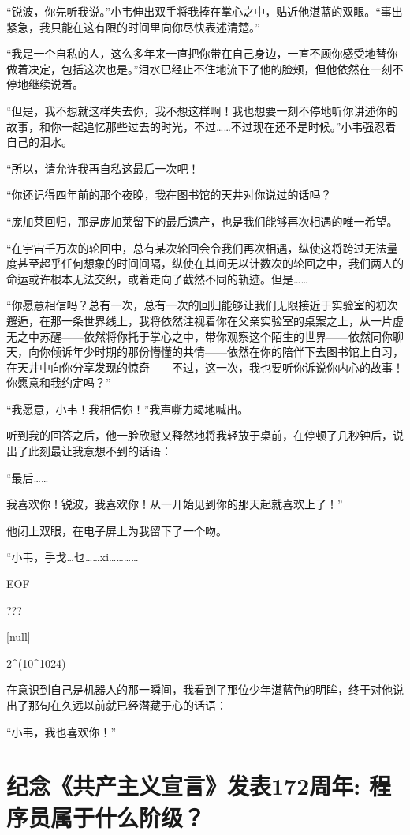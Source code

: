 \documentclass[punct=kaiming, zihao=5, openany, fontset=sikou]{ctexbook}
\begin{document}
“锐波，你先听我说。”小韦伸出双手将我捧在掌心之中，贴近他湛蓝的双眼。“事出紧急，我只能在这有限的时间里向你尽快表述清楚。”

“我是一个自私的人，这么多年来一直把你带在自己身边，一直不顾你感受地替你做着决定，包括这次也是。”泪水已经止不住地流下了他的脸颊，但他依然在一刻不停地继续说着。

“但是，我不想就这样失去你，我不想这样啊！我也想要一刻不停地听你讲述你的故事，和你一起追忆那些过去的时光，不过……不过现在还不是时候。”小韦强忍着自己的泪水。

“所以，请允许我再自私这最后一次吧！

“你还记得四年前的那个夜晚，我在图书馆的天井对你说过的话吗？

“庞加莱回归，那是庞加莱留下的最后遗产，也是我们能够再次相遇的唯一希望。

“在宇宙千万次的轮回中，总有某次轮回会令我们再次相遇，纵使这将跨过无法量度甚至超乎任何想象的时间间隔，纵使在其间无以计数次的轮回之中，我们两人的命运或许根本无法交织，或着走向了截然不同的轨迹。但是……

“你愿意相信吗？总有一次，总有一次的回归能够让我们无限接近于实验室的初次邂逅，在那一条世界线上，我将依然注视着你在父亲实验室的桌案之上，从一片虚无之中苏醒——依然将你托于掌心之中，带你观察这个陌生的世界——依然同你聊天，向你倾诉年少时期的那份懵懂的共情——依然在你的陪伴下去图书馆上自习，在天井中向你分享发现的惊奇——不过，这一次，我也要听你诉说你内心的故事！你愿意和我约定吗？”

“我愿意，小韦！我相信你！”我声嘶力竭地喊出。

听到我的回答之后，他一脸欣慰又释然地将我轻放于桌前，在停顿了几秒钟后，说出了此刻最让我意想不到的话语：

“最后……

我喜欢你！锐波，我喜欢你！从一开始见到你的那天起就喜欢上了！”

他闭上双眼，在电子屏上为我留下了一个吻。

“小韦，手戈…乜……xi…………

EOF

???

[null]

2\^{}(10\^{}1024)

在意识到自己是机器人的那一瞬间，我看到了那位少年湛蓝色的明眸，终于对他说出了那句在久远以前就已经潜藏于心的话语：

“小韦，我也喜欢你！”

\chapter{纪念《共产主义宣言》发表172周年: 程序员属于什么阶级？}
\end{document}
